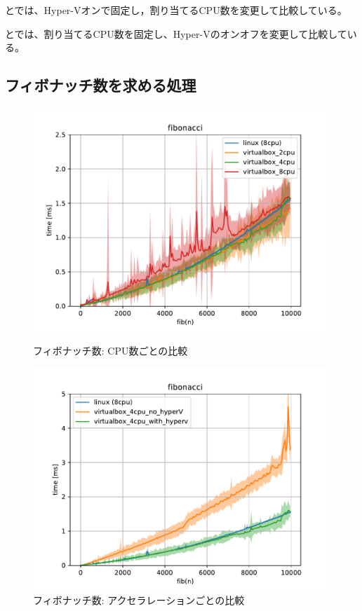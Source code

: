 \documentclass[onecolumn]{preport}
\begin{document}
とでは、Hyper-Vオンで固定し，割り当てるCPU数を変更して比較している。

とでは、割り当てるCPU数を固定し、Hyper-Vのオンオフを変更して比較している。

\subsection{フィボナッチ数を求める処理}
\begin{figure}[H]
  \begin{center}
    \begin{minipage}{0.49\columnwidth}   
      \includegraphics[width=\columnwidth]{_fib_cpu.pdf}
      \caption{フィボナッチ数: CPU数ごとの比較}
      \label{figure:fib_cpu}
    \end{minipage}
    \begin{minipage}{0.49\columnwidth}
      \includegraphics[width=\columnwidth]{fib_acc.pdf}
      \caption{フィボナッチ数: アクセラレーションごとの比較}
      \label{figure:fib_acc}
    \end{minipage}
  \end{center}
\end{figure}
\end{document}
